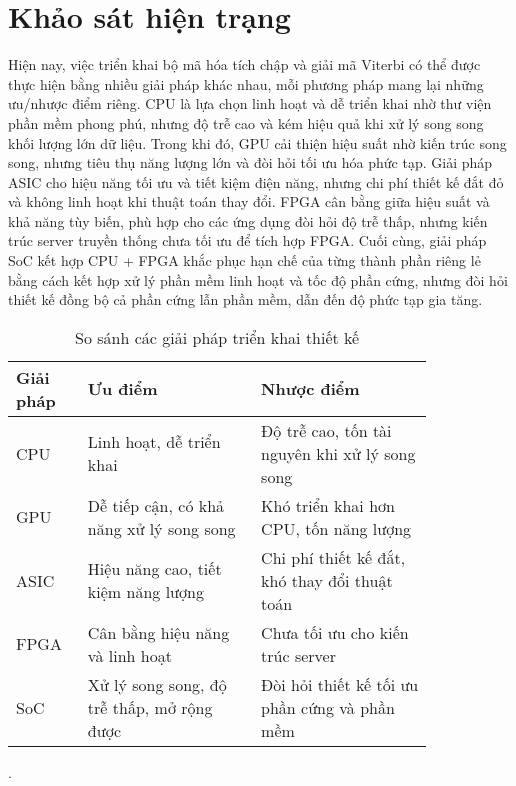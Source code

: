 \documentclass[../DoAn.tex]{subfiles}
\begin{document}
\section{Khảo sát hiện trạng}

Hiện nay, việc triển khai bộ mã hóa tích chập và giải mã Viterbi có thể được thực hiện bằng nhiều giải pháp khác nhau, mỗi phương pháp mang lại những ưu/nhược điểm riêng. CPU là lựa chọn linh hoạt và dễ triển khai nhờ thư viện phần mềm phong phú, nhưng độ trễ cao và kém hiệu quả khi xử lý song song khối lượng lớn dữ liệu. Trong khi đó, GPU cải thiện hiệu suất nhờ kiến trúc song song, nhưng tiêu thụ năng lượng lớn và đòi hỏi tối ưu hóa phức tạp. Giải pháp ASIC cho hiệu năng tối ưu và tiết kiệm điện năng, nhưng chi phí thiết kế đắt đỏ và không linh hoạt khi thuật toán thay đổi. FPGA cân bằng giữa hiệu suất và khả năng tùy biến, phù hợp cho các ứng dụng đòi hỏi độ trễ thấp, nhưng kiến trúc server truyền thống chưa tối ưu để tích hợp FPGA. Cuối cùng, giải pháp SoC kết hợp CPU + FPGA khắc phục hạn chế của từng thành phần riêng lẻ bằng cách kết hợp xử lý phần mềm linh hoạt và tốc độ phần cứng, nhưng đòi hỏi thiết kế đồng bộ cả phần cứng lẫn phần mềm, dẫn đến độ phức tạp gia tăng.

\begin{table}[H]
\centering{}
    \begin{tabular}{p{0.13\linewidth} p{0.35\linewidth} p{0.35\linewidth}}
        \hline
        \textbf{Giải pháp} & \textbf{Ưu điểm}  & \textbf{Nhược điểm}\\ \hline\hline
        CPU  & Linh hoạt, dễ triển khai  & Độ trễ cao, tốn tài nguyên khi xử lý song song   \\ \hline
        GPU  & Dễ tiếp cận, có khả năng xử lý song song  & Khó triển khai hơn CPU, tốn năng lượng   \\ \hline
        ASIC   & Hiệu năng cao, tiết kiệm năng lượng   & Chi phí thiết kế đắt, khó thay đổi thuật toán  \\ \hline
        FPGA        & Cân bằng hiệu năng và linh hoạt   & Chưa tối ưu cho kiến trúc server   \\ \hline
        SoC  & Xử lý song song, độ trễ thấp, mở rộng được   & Đòi hỏi thiết kế tối ưu phần cứng và phần mềm  \\ \hline
        \end{tabular}
    \caption{So sánh các giải pháp triển khai thiết kế}
    \label{table:So sánh các giải pháp triển khai thiết kế}
\end{table}.
\end{document}
